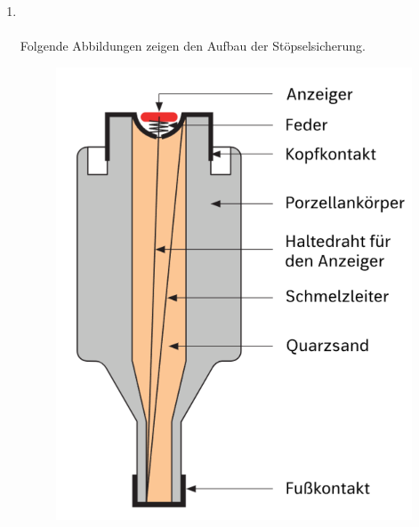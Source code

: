 \begin{enumerate}
    \clearpage
    \item   {} \\\\
            Folgende Abbildungen zeigen den Aufbau der Stöpselsicherung.
            \begin{figure}[!htp]
                \centering
                \includegraphics[scale = 0.3]{img/Stopsel_Aufbau.png}
            \end{figure}


\end{enumerate}
